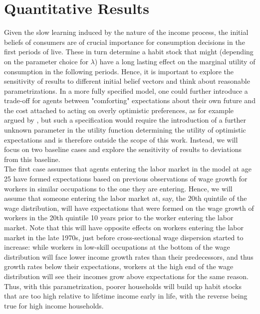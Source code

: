 \section{Quantitative Results}\label{sec:qr}
Given the slow learning induced by the nature of the income process, the initial beliefs of consumers are of crucial importance for consumption decisions in the first periods of live. These in turn determine a habit stock that might (depending on the parameter choice for $\lambda$) have a long lasting effect on the marginal utility of consumption in the following periods. Hence, it is important to explore the sensitivity of results to different initial belief vectors and think about reasonable parametrizations. In a more fully specified model, one could further introduce a trade-off for agents between "comforting" expectations about their own future and the cost attached to acting on overly optimistic preferences, as for example argued by \citet{Glaeser2004}, but such a specification would require the introduction of a further unknown parameter in the utility function determining the utility of optimistic expectations and is therefore outside the scope of this work. Instead, we will focus on two baseline cases and explore the sensitivity of results to deviations from this baseline. \\
The first case assumes that agents entering the labor market in the model at age 25 have formed expectations based on previous observations of wage growth for workers in similar occupations to the one they are entering. Hence, we will assume that someone entering the labor market at, say, the 20th quintile of the wage distribution, will have expectations that were formed on the wage growth of workers in the 20th quintile 10 years prior to the worker entering the labor market. Note that this will have opposite effects on workers entering the labor market in the late 1970s, just before cross-sectional wage dispersion started to increase: while workers in low-skill occupations at the bottom of the wage distribution will face lower income growth rates than their predecessors, and thus growth rates below their expectations, workers at the high end of the wage distribution will see their incomes grow above expectations for the same reason. Thus, with this parametrization, poorer households will build up habit stocks that are too high relative to lifetime income early in life, with the reverse being true for high income households. \\
